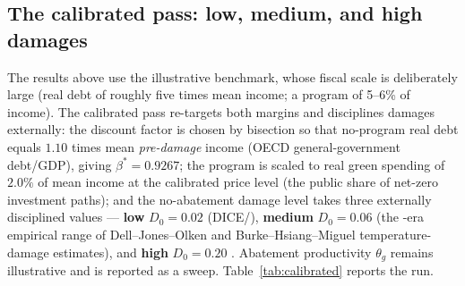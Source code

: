 \documentclass[12pt]{article}
\begin{document}
\subsection{The calibrated pass: low, medium, and high damages}
\label{subsec:calibrated}

The results above use the illustrative benchmark, whose fiscal scale is
deliberately large (real debt of roughly five times mean income; a program of
5--6\% of income). The calibrated pass re-targets both margins and
disciplines damages externally: the discount factor is chosen by bisection so
that no-program real debt equals $1.10$ times mean \emph{pre-damage} income
(OECD general-government debt/GDP), giving $\beta^{*}=0.9267$; the program is
scaled to real green spending of $2.0\%$ of mean income at the calibrated
price level (the public share of net-zero investment paths); and the
no-abatement damage level takes three externally disciplined values ---
\textbf{low} $D_0=0.02$ (DICE/\citealp{nordhaus2017}), \textbf{medium}
$D_0=0.06$ (the \citealp{golosov2014}-era empirical range of
Dell--Jones--Olken and Burke--Hsiang--Miguel temperature-damage estimates),
and \textbf{high} $D_0=0.20$ \citep{bilalkanzig2024}. Abatement productivity
$\theta_g$ remains illustrative and is reported as a sweep.
Table~\ref{tab:calibrated} reports the run.
\end{document}
